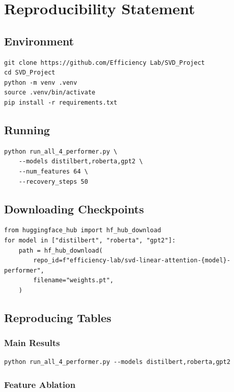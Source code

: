 
\section{Reproducibility Statement}

\subsection{Environment}

\begin{lstlisting}
git clone https://github.com/Efficiency Lab/SVD_Project
cd SVD_Project
python -m venv .venv
source .venv/bin/activate
pip install -r requirements.txt
\end{lstlisting}

\subsection{Running}

\begin{lstlisting}
python run_all_4_performer.py \
    --models distilbert,roberta,gpt2 \
    --num_features 64 \
    --recovery_steps 50
\end{lstlisting}

\subsection{Downloading Checkpoints}

\begin{lstlisting}
from huggingface_hub import hf_hub_download
for model in ["distilbert", "roberta", "gpt2"]:
    path = hf_hub_download(
        repo_id=f"efficiency-lab/svd-linear-attention-{model}-performer",
        filename="weights.pt",
    )
\end{lstlisting}

\subsection{Reproducing Tables}

\subsubsection{Main Results}

\begin{lstlisting}
python run_all_4_performer.py --models distilbert,roberta,gpt2
\end{lstlisting}

\subsubsection{Feature Ablation}

